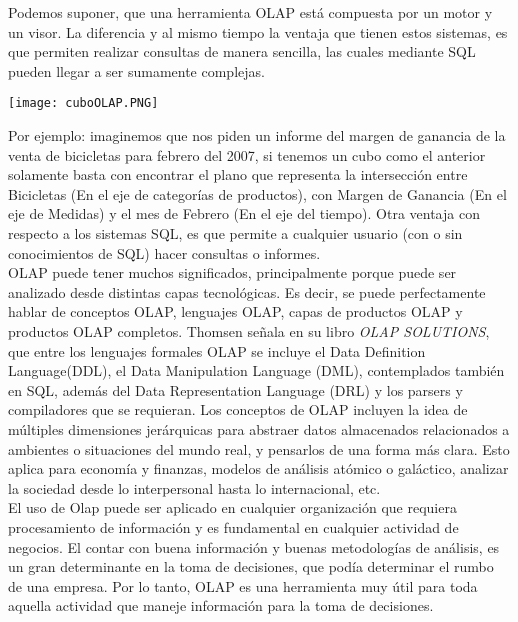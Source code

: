 \documentclass[DIV=calc, paper=a4, fontsize=11pt, twocolumn]{scrartcl}	 %
\begin{document}
Podemos suponer, que una herramienta OLAP est\'{a} compuesta por un motor y un visor. La diferencia y al mismo tiempo la ventaja que tienen estos sistemas, es que permiten realizar consultas de manera sencilla, las cuales mediante SQL pueden llegar a ser sumamente complejas.

\begin{center}
\texttt{[image: cuboOLAP.PNG]}
\end{center}

Por ejemplo: imaginemos que nos piden un informe del margen de ganancia de la venta de bicicletas para febrero del 2007, si tenemos un cubo como el anterior solamente basta con encontrar el plano que representa la intersecci\'{o}n entre Bicicletas (En el eje de categorías de productos), con Margen de Ganancia (En el eje de Medidas) y el mes de Febrero (En el eje del tiempo).
Otra ventaja con respecto a los sistemas SQL, es que permite a cualquier usuario (con o sin conocimientos de SQL) hacer consultas o informes.\\

OLAP puede tener muchos significados,  principalmente porque puede ser analizado desde distintas capas tecnol\'{o}gicas. Es decir, se puede perfectamente hablar de conceptos OLAP, lenguajes OLAP, capas de productos OLAP y productos OLAP completos.
Thomsen se\~{n}ala en su libro \textit{OLAP SOLUTIONS}, que entre los lenguajes formales OLAP se incluye el Data Definition Language(DDL), el Data Manipulation Language (DML), contemplados tambi\'{e}n en SQL, adem\'{a}s del Data Representation Language (DRL) y los parsers y compiladores que se requieran.
Los conceptos de OLAP incluyen la idea de m\'{u}ltiples dimensiones jer\'{a}rquicas para abstraer datos almacenados relacionados a ambientes o situaciones del mundo real, y pensarlos de una forma m\'{a}s clara. Esto aplica para econom\'{i}a y finanzas, modelos de an\'{a}lisis at\'{o}mico o gal\'{a}ctico, analizar la sociedad desde lo interpersonal hasta lo internacional, etc.\\
El uso de Olap puede ser aplicado en cualquier organizaci\'{o}n que requiera procesamiento de informaci\'{o}n y es fundamental en cualquier actividad de negocios. El contar con buena informaci\'{o}n y buenas metodolog\'{i}as de an\'{a}lisis, es un gran determinante en la toma de decisiones, que pod\'{i}a determinar el rumbo de una empresa.
Por lo tanto, OLAP es una herramienta muy \'{u}til para toda aquella actividad que maneje informaci\'{o}n para la toma de decisiones.
\end{document}
